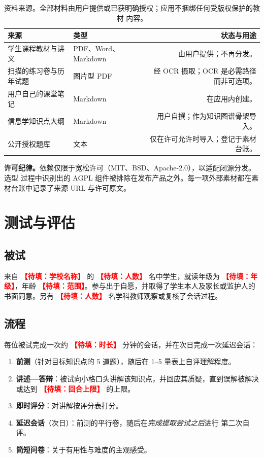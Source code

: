 \documentclass[11pt,a4paper,UTF8,fontset=windows]{ctexart}
\newcommand{\fillin}[1]{\textcolor{red}{\textbf{【待填：#1】}}}
\begin{document}
\begin{table}[h]
\centering
\small
\begin{tabularx}{\textwidth}{@{}p{4.2cm} p{3.4cm} R@{}}
\toprule
\textbf{来源} & \textbf{类型} & \textbf{状态与用途} \\
\midrule
学生课程教材与讲义 & PDF、Word、Markdown & 由用户提供；不再分发。 \\
扫描的练习卷与历年试题 & 图片型 PDF & 经 OCR 摄取；OCR 是必需路径而非可选项。 \\
用户自己的课堂笔记 & Markdown & 在应用内创建。 \\
信息学知识点大纲 & Markdown & 用户自撰；作为知识图谱骨架导入。 \\
公开授权题库 & 文本 & 仅在许可允许时导入；登记于素材台账。 \\
\bottomrule
\end{tabularx}
\caption{资料来源。全部材料由用户提供或已获明确授权；应用不捆绑任何受版权保护的教材
内容。}
\label{tab:data}
\end{table}

\textbf{许可纪律。}依赖仅限于宽松许可（MIT、BSD、Apache-2.0），以适配闭源分发。选型
过程中识别出的 AGPL 组件被排除在发布产品之外。每一项外部素材都在素材台账中记录了来源
URL 与许可原文。

\section{测试与评估}

\subsection{被试}

来自 \fillin{学校名称} 的 \fillin{人数} 名中学生，就读年级为 \fillin{年级}，年龄
\fillin{范围}。参与出于自愿，并取得了学生本人及家长或监护人的书面同意。另有
\fillin{人数} 名学科教师观察或复核了会话过程。

\subsection{流程}

每位被试完成一次约 \fillin{时长} 分钟的会话，并在次日完成一次延迟会话：

\begin{enumerate}
  \item \textbf{前测}（针对目标知识点的 5 道题），随后在 1--5 量表上自评理解程度。
  \item \textbf{讲述—答辩}：被试向小格口头讲解该知识点，并回应其质疑，直到误解被解决
  或达到 \fillin{回合上限} 的上限。
  \item \textbf{即时评分}：对讲解按评分表打分。
  \item \textbf{延迟会话}（次日）：前测的平行卷，随后在\emph{完成提取尝试之后}进行
  第二次自评。
  \item \textbf{简短问卷}：关于有用性与难度的主观感受。
\end{enumerate}
\end{document}
